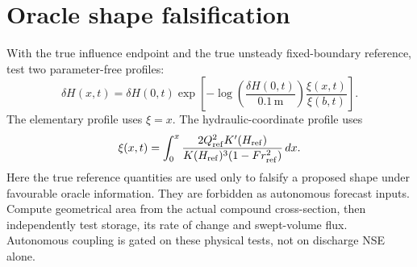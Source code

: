 \documentclass[11pt]{article}
\begin{document}
\section*{Oracle shape falsification}
With the true influence endpoint and the true unsteady fixed-boundary reference, test two parameter-free profiles:
\begin{equation}
\delta H(x,t)=\delta H(0,t)\exp\left[-\log\!\left(\frac{\delta H(0,t)}{0.1\,\mathrm m}\right)\frac{\xi(x,t)}{\xi(b,t)}\right].
\end{equation}
The elementary profile uses $\xi=x$. The hydraulic-coordinate profile uses
\begin{equation}
\xi(x,t)=\int_0^x\frac{2Q_{\rm ref}^2K'(H_{\rm ref})}{K(H_{\rm ref})^3(1-Fr_{\rm ref}^2)}\,dx.
\end{equation}
Here the true reference quantities are used only to falsify a proposed shape under favourable oracle information. They are forbidden as autonomous forecast inputs. Compute geometrical area from the actual compound cross-section, then independently test storage, its rate of change and swept-volume flux. Autonomous coupling is gated on these physical tests, not on discharge NSE alone.
\end{document}
